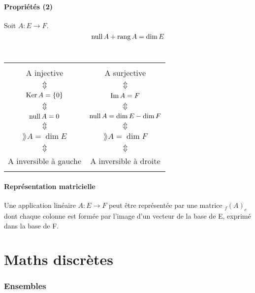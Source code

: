 \subsection{Propriétés (2)}
Soit $A : E \rightarrow F$.\\
\[\operatorname{null} A + \operatorname{rang} A = \dim E\]\\
\begin{center}
\begin{tabular}{|c c|}
\hline
&\\
A injective & A surjective\\
$\Updownarrow$ & $\Updownarrow$\\
$\operatorname{Ker} A = \{0\}$ & $\operatorname{Im} A = F$\\
$\Updownarrow$ & $\Updownarrow$\\
$\operatorname{null} A = 0$ & $\operatorname{null} A = \dim E - \dim F$\\
$\Updownarrow$ & $\Updownarrow$\\
$\rang A = \dim E$ & $\rang A = \dim F$\\
$\Updownarrow$ & $\Updownarrow$\\
A inversible à gauche&A inversible à droite\\
&\\
\hline
\end{tabular}
\end{center}

\subsection{Représentation matricielle}
Une application linéaire $A : E \rightarrow F$ peut être représentée par une matrice $_f(A)_e$ dont chaque colonne est formée par l'image d'un vecteur de la base de E, exprimé dans la base de F.

\part{Maths discrètes}

\section{Ensembles}

